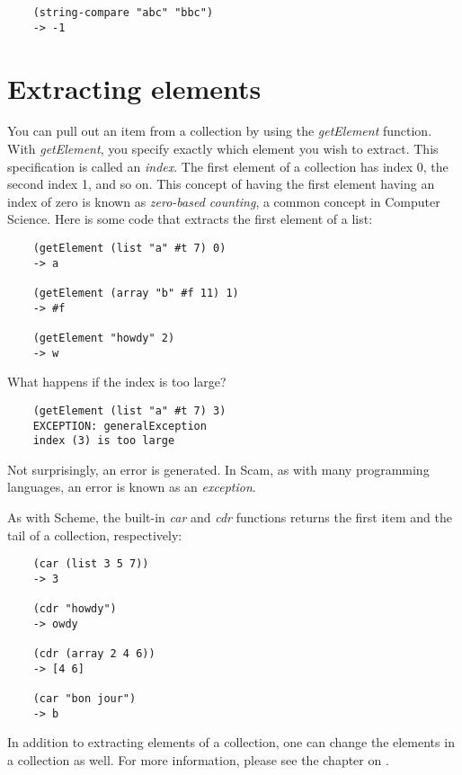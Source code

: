 \begin{verbatim}
    (string-compare "abc" "bbc")
    -> -1
\end{verbatim}

\section{Extracting elements}

You can pull out an item from a collection
by using the
{\it getElement} function.
With {\it getElement},
you specify exactly which element
you wish to extract. This specification is called an
{\it index}. The first element of a collection has index 0, the second
index 1, and so on. This concept of having the first element having
an index of zero is known as {\it zero-based counting}, a common concept
in Computer Science. Here is some code that extracts the first element
of a list:

\begin{verbatim}
    (getElement (list "a" #t 7) 0)
    -> a

    (getElement (array "b" #f 11) 1)
    -> #f

    (getElement "howdy" 2)
    -> w
\end{verbatim}

What happens if the index is too large?

\begin{verbatim}
    (getElement (list "a" #t 7) 3)
    EXCEPTION: generalException
    index (3) is too large
\end{verbatim}

Not surprisingly, an error is generated.
In Scam, as with many programming languages, an error is known
as an {\it exception}.

As with Scheme, the built-in {\it car} and {\it cdr} functions
returns the first item and the tail of a collection, respectively:

\begin{verbatim}
    (car (list 3 5 7))
    -> 3

    (cdr "howdy")
    -> owdy

    (cdr (array 2 4 6))
    -> [4 6]

    (car "bon jour")
    -> b
\end{verbatim}

In addition to extracting elements of a collection, one can 
change the elements in a collection as well. For more
information, please see the chapter on 
.

